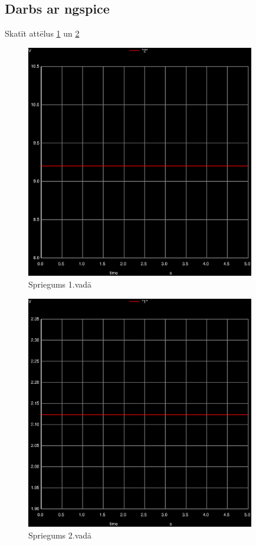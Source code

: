 \documentclass{report}
\begin{document}
\subsection{Darbs ar ngspice}
Skatīt attēlus \ref{fig:2.1} un \ref{fig:2.2} 
\begin{figure}[!h]
    \centering
    \includegraphics[width=10cm]{012.ps}
    \caption{Spriegums 1.vadā}
    \label{fig:2.1}
    \end{figure}
 \begin{figure}[t]
 \centering
    \includegraphics[width=10cm]{011.ps}
    \caption{Spriegums 2.vadā}
    \label{fig:2.2}
\end{figure}
\newpage
\end{document}
